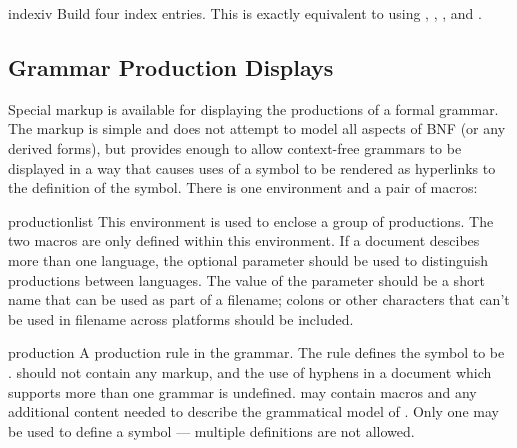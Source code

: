 \documentclass{howto}
\begin{document}
    \begin{macrodesc}{indexiv}{}
      Build four index entries.  This is exactly equivalent to using
      ,
      ,
      ,
      and
      .
    \end{macrodesc}

  \subsection{Grammar Production Displays \label{grammar-displays}}

    Special markup is available for displaying the productions of a
    formal grammar.  The markup is simple and does not attempt to
    model all aspects of BNF (or any derived forms), but provides
    enough to allow context-free grammars to be displayed in a way
    that causes uses of a symbol to be rendered as hyperlinks to the
    definition of the symbol.  There is one environment and a pair of
    macros:

    \begin{envdesc}{productionlist}{}
      This environment is used to enclose a group of productions.  The
      two macros are only defined within this environment.  If a
      document descibes more than one language, the optional parameter
       should be used to distinguish productions between
      languages.  The value of the parameter should be a short name
      that can be used as part of a filename; colons or other
      characters that can't be used in filename across platforms
      should be included.
    \end{envdesc}

    \begin{macrodesc}{production}{}
      A production rule in the grammar.  The rule defines the symbol
       to be .   should not
      contain any markup, and the use of hyphens in a document which
      supports more than one grammar is undefined.  
      may contain  macros and any additional content
      needed to describe the grammatical model of .  Only
      one  may be used to define a symbol ---
      multiple definitions are not allowed.
    \end{macrodesc}
\end{document}
